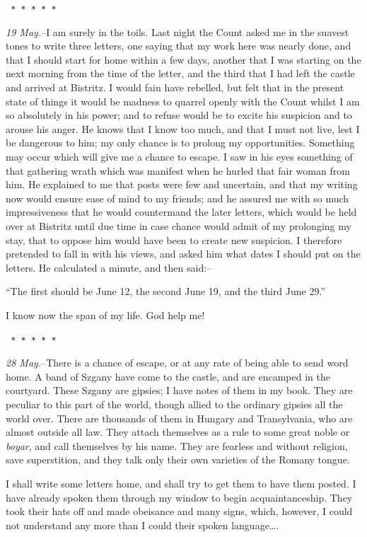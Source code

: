 \documentclass[12pt,openright]{book}
\begin{document}
\texttt{   *       *       *       *       *}

\textit{19 May.}–I am surely in the toils. Last night the Count asked me in the suavest tones to write three letters, one saying that my work here was nearly done, and that I should start for home within a few days, another that I was starting on the next morning from the time of the letter, and the third that I had left the castle and arrived at Bistritz. I would fain have rebelled, but felt that in the present state of things it would be madness to quarrel openly with the Count whilst I am so absolutely in his power; and to refuse would be to excite his suspicion and to arouse his anger. He knows that I know too much, and that I must not live, lest I be dangerous to him; my only chance is to prolong my opportunities. Something may occur which will give me a chance to escape. I saw in his eyes something of that gathering wrath which was manifest when he hurled that fair woman from him. He explained to me that posts were few and uncertain, and that my writing now would ensure ease of mind to my friends; and he assured me with so much impressiveness that he would countermand the later letters, which would be held over at Bistritz until due time in case chance would admit of my prolonging my stay, that to oppose him would have been to create new suspicion. I therefore pretended to fall in with his views, and asked him what dates I should put on the letters. He calculated a minute, and then said:–

“The first should be June 12, the second June 19, and the third June 29.”

I know now the span of my life. God help me!

\texttt{   *       *       *       *       *}

\textit{28 May.}–There is a chance of escape, or at any rate of being able to send word home. A band of Szgany have come to the castle, and are encamped in the courtyard. These Szgany are gipsies; I have notes of them in my book. They are peculiar to this part of the world, though allied to the ordinary gipsies all the world over. There are thousands of them in Hungary and Transylvania, who are almost outside all law. They attach themselves as a rule to some great noble or \textit{boyar}, and call themselves by his name. They are fearless and without religion, save superstition, and they talk only their own varieties of the Romany tongue.

I shall write some letters home, and shall try to get them to have them posted. I have already spoken them through my window to begin acquaintanceship. They took their hats off and made obeisance and many signs, which, however, I could not understand any more than I could their spoken language….
\end{document}
